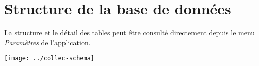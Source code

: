 \chapter{Structure de la base de données}

La structure et le détail des tables peut être consulté directement depuis le menu \textit{Paramètres} de l'application.

\texttt{[image: ../collec-schema]}

